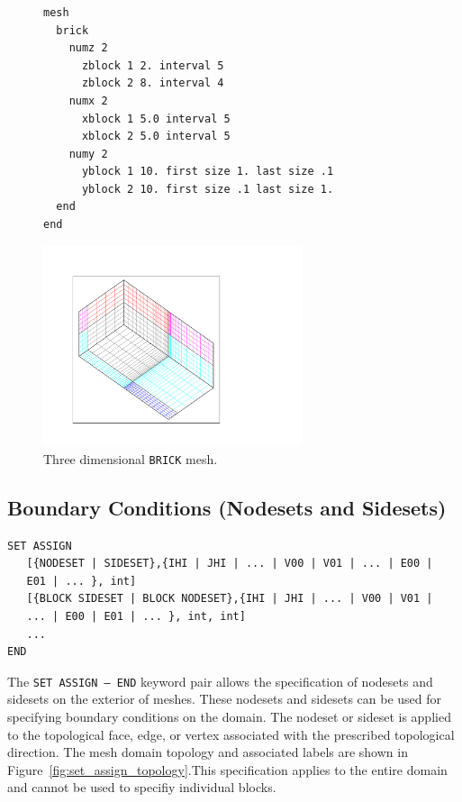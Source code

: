 \begin{figure}[htbp]
\centering
  \begin{minipage}[c]{0.4\linewidth}
    \centering
{\ttfamily \begin{verbatim}










mesh
  brick
    numz 2
      zblock 1 2. interval 5
      zblock 2 8. interval 4
    numx 2
      xblock 1 5.0 interval 5
      xblock 2 5.0 interval 5
    numy 2
      yblock 1 10. first size 1. last size .1
      yblock 2 10. first size .1 last size 1.
  end
end
\end{verbatim}}
  \end{minipage}%
  \hfil
  \begin{minipage}[c]{0.6\linewidth}
    \centering
      \includegraphics[width=3.0in]{brick}
  \end{minipage}
  \caption{Three dimensional \texttt{BRICK} mesh.}
  \label{fig:brick1}
\end{figure}


\clearpage
\subsection{Boundary Conditions (Nodesets and Sidesets)}
\label{sec:nodesets-sidests}

{\ttfamily \small \begin{verbatim}
SET ASSIGN 
   [{NODESET | SIDESET},{IHI | JHI | ... | V00 | V01 | ... | E00 | 
   E01 | ... }, int]
   [{BLOCK SIDESET | BLOCK NODESET},{IHI | JHI | ... | V00 | V01 | 
   ... | E00 | E01 | ... }, int, int]
   ...
END
\end{verbatim}
}

The \texttt{SET ASSIGN -- END} keyword pair allows the specification
of nodesets and sidesets on the exterior of meshes.  These
nodesets and sidesets can be used for specifying boundary conditions
on the domain. The nodeset or sideset is applied to the topological
face, edge, or vertex associated with the prescribed topological
direction. The mesh domain topology and associated labels are
shown in Figure~\ref{fig:set_assign_topology}.This specification
applies to the entire  domain and cannot be used to
specifiy individual blocks.

